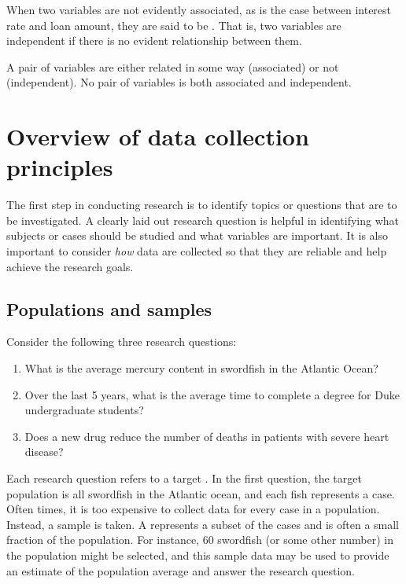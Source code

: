When two variables are not evidently associated,
as is the case between interest rate and loan amount,
they are said to be .
That is, two variables are independent if there is
no evident relationship between them.

\begin{termBox}{
A pair of variables are either related in some way (associated) or not (independent). No pair of variables is both associated and independent.}
\end{termBox}



\section[Overview of data collection principles]{Overview of data collection principles  }
\label{overviewOfDataCollectionPrinciples}


The first step in conducting research is to identify topics or questions that are to be investigated. A clearly laid out research question is helpful in identifying what subjects or cases should be studied and what variables are important. It is also important to consider \emph{how} data are collected so that they are reliable and help achieve the research goals.

\subsection{Populations and samples}
\label{populationsAndSamples}

Consider the following three research questions:
\begin{enumerate}
\setlength{\itemsep}{0mm}
\item What is the average mercury content in swordfish in the Atlantic Ocean?
\item\label{timeToGraduationQuestionForUCLAStudents} Over the last 5 years, what is the average time to complete a degree for Duke undergraduate students?
\item\label{identifyPopulationOfStentStudy} Does a new drug reduce the number of deaths in patients with severe heart disease?
\end{enumerate}
Each research question refers to a target . In the first question, the target population is all swordfish in the Atlantic ocean, and each fish represents a case. Often times, it is too expensive to collect data for every case in a population. Instead, a sample is taken. A  represents a subset of the cases and is often a small fraction of the population. For instance, 60 swordfish (or some other number) in the population might be selected, and this sample data may be used to provide an estimate of the population average and answer the research question.

